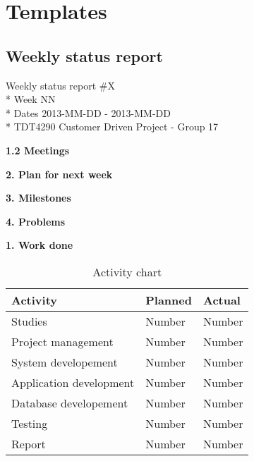 \chapter{Templates}
\label{AppendixC} 

\section{Weekly status report}


\begin{center}
Weekly status report \#X\\*
Week NN \\*
Dates 2013-MM-DD - 2013-MM-DD \\*
TDT4290 Customer Driven Project - Group 17
\end{center}

\textbf{1.2 Meetings}

\textbf{2. Plan for next week}

\textbf{3. Milestones}

\textbf{4. Problems}

\textbf{1. Work done}

\begin{table}[H]
\begin{center}
\begin{tabular}{ l | l | l }
  \hline
  Activity & Planned & Actual \\
  \hline\noalign{\smallskip}\noalign{\smallskip}\hline
  Studies & Number & Number \\
  Project management & Number & Number \\
  System developement & Number & Number \\
  Application development & Number & Number \\
  Database developement & Number & Number \\
  Testing & Number & Number \\
  Report & Number & Number \\
  \hline
\end{tabular}
\end{center}
\caption{Activity chart}
\label{table:activityChartStatusReport}
\end{table}


